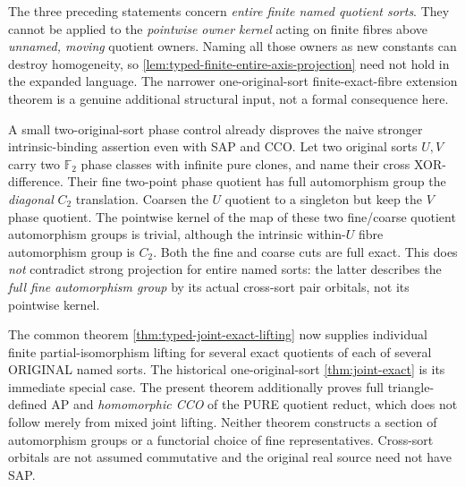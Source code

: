 \begin{remark}
\label{rem:typed-finite-goursat-kernel-scope}
The three preceding statements concern \emph{entire finite
named quotient sorts}. They cannot be applied to the
\emph{pointwise owner kernel} acting on finite fibres above
\emph{unnamed, moving} quotient owners. Naming all those
owners as new constants can destroy homogeneity, so
\cref{lem:typed-finite-entire-axis-projection} need not
hold in the expanded language. The narrower one-original-sort
finite-exact-fibre extension theorem is a genuine
additional structural input, not a formal consequence here.

A small two-original-sort phase control already disproves
the naive stronger intrinsic-binding assertion even with SAP
and CCO. Let two original sorts $U,V$ carry two $\mathbb F_2$
phase classes with infinite pure clones, and name their
cross XOR-difference. Their fine two-point phase quotient
has full automorphism group the \emph{diagonal} $C_2$
translation. Coarsen the $U$ quotient to a singleton but
keep the $V$ phase quotient. The pointwise kernel of the
map of these two fine/coarse quotient automorphism groups
is trivial, although the intrinsic within-$U$ fibre
automorphism group is $C_2$. Both the fine and coarse cuts
are full exact. This does \emph{not} contradict strong
projection for entire named sorts: the latter describes
the \emph{full fine automorphism group} by its actual
cross-sort pair orbitals, not its pointwise kernel.
\end{remark}

\begin{remark}
\label{rem:typed-simultaneous-exact-scope}
The common theorem
\cref{thm:typed-joint-exact-lifting} now supplies
individual finite partial-isomorphism lifting for several
exact quotients of each of several ORIGINAL named sorts.
The historical one-original-sort \cref{thm:joint-exact}
is its immediate special case.  The present theorem additionally
proves full triangle-defined AP and \emph{homomorphic CCO} of
the PURE quotient reduct, which does not follow merely from
mixed joint lifting.  Neither theorem constructs a section
of automorphism groups or a functorial choice of fine
representatives.  Cross-sort orbitals are not assumed
commutative and the original real source need not have SAP.
\end{remark}
